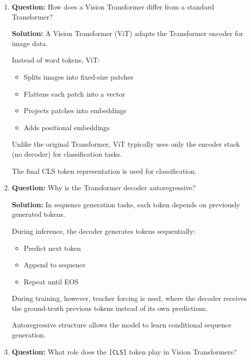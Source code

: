 \documentclass[11pt]{article}
\begin{document}
\begin{enumerate}
\begin{itemize}[nosep]
\end{itemize}

Because Transformers often operate with variable sequence lengths and small batches, layer normalization is generally preferred.

\item \textbf{Question:} How does a Vision Transformer differ from a standard Transformer?

\textbf{Solution:}
A Vision Transformer (ViT) adapts the Transformer encoder for image data.

Instead of word tokens, ViT:

\begin{itemize}[nosep]

\item Splits images into fixed-size patches
\item Flattens each patch into a vector
\item Projects patches into embeddings
\item Adds positional embeddings

\end{itemize}

Unlike the original Transformer, ViT typically uses only the encoder stack (no decoder) for classification tasks.

The final CLS token representation is used for classification.

\item \textbf{Question:} Why is the Transformer decoder autoregressive?

\textbf{Solution:}
In sequence generation tasks, each token depends on previously generated tokens.

During inference, the decoder generates tokens sequentially:

\begin{itemize}[nosep]

\item Predict next token
\item Append to sequence
\item Repeat until EOS

\end{itemize}

During training, however, teacher forcing is used, where the decoder receives the ground-truth previous tokens instead of its own predictions.

Autoregressive structure allows the model to learn conditional sequence generation.

\item \textbf{Question:} What role does the \texttt{[CLS]} token play in Vision Transformers?


\end{enumerate}
\end{document}
